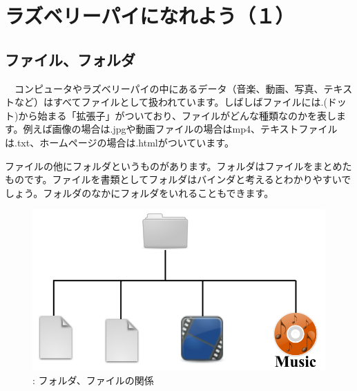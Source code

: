 \documentclass[a4paper,12pt]{jarticle}
\begin{document}
\section{ラズベリーパイになれよう（１）}
\subsection{ファイル、フォルダ}
\ \ コンピュータやラズベリーパイの中にあるデータ（音楽、動画、写真、テキストなど）はすべてファイルとして扱われています。しばしばファイルには.(ドット)から始まる「拡張子」がついており、ファイルがどんな種類なのかを表します。例えば画像の場合は.jpgや動画ファイルの場合はmp4、テキストファイルは.txt、ホームページの場合は.htmlがついています。

ファイルの他にフォルダというものがあります。フォルダはファイルをまとめたものです。ファイルを書類としてフォルダはバインダと考えるとわかりやすいでしょう。フォルダのなかにフォルダをいれることもできます。



\begin{figure}[hb]
  \centering
  \begin{minipage}{0.76\textwidth}


    \includegraphics[width=\linewidth]{figure15.png}
    {\upshape
      \newline
      :
      フォルダ、ファイルの関係}
  \end{minipage}
\end{figure}
\end{document}
